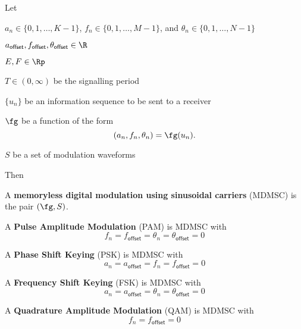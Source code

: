 \begin{definition}
\label{def:psk}
\label{def:qam}
\label{def:pam}
Let 
\begin{liste}
  \item $a_n\in\{0,1,\ldots,K-1\}$, $f_n\in\{0,1,\ldots,M-1\}$, and $\theta_n\in\{0,1,\ldots,N-1\}$
  \item $a_{\mathsf{offset}}, f_{\mathsf{offset}}, \theta_{\mathsf{offset}}\in\R$
  \item $E,F\in\Rp$
  \item $T\in(0,\infty)$ be the signalling period
  \item $\{u_n\}$ be an information sequence to be sent to a receiver
  \item $\fg$ be a function of the form
        \[ (a_n,f_n,\theta_n) = \fg(u_n). \]
  \item $S$ be a set of modulation waveforms
\end{liste}
Then
\begin{liste}
  \item A {\bf memoryless digital modulation using sinusoidal carriers} (MDMSC)
        is the pair $(\fg,S)$.
  \item A {\bf Pulse Amplitude Modulation} (PAM) is MDMSC with 
        \[f_n= f_{\mathsf{offset}} = \theta_n = \theta_{\mathsf{offset}} = 0\]
  \item A {\bf Phase Shift Keying} (PSK) is MDMSC with 
        \[a_n = a_{\mathsf{offset}} = f_n = f_{\mathsf{offset}} = 0\]
  \item A {\bf Frequency Shift Keying} (FSK) is MDMSC with 
        \[a_n = a_{\mathsf{offset}} = \theta_n = \theta_{\mathsf{offset}} = 0\]
  \item A {\bf Quadrature Amplitude Modulation} (QAM) is MDMSC with 
        \[f_n = f_{\mathsf{offset}} = 0\]
\end{liste}
\end{definition}

